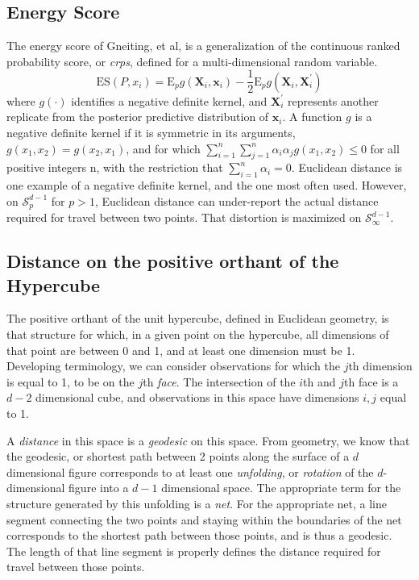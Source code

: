 \subsection{Energy Score}
The energy score of Gneiting, et al\cite{gneiting2007}, is a generalization of the continuous ranked
  probability score, or \emph{crps}, defined for a multi-dimensional random variable.
  \begin{equation}
    \label{eq:es}
    \text{ES}\left(P,x_i\right) =  \text{E}_p g\left(\bm{X}_i, \bm{x}_i\right) - \frac{1}{2}\text{E}_p g\left(\bm{X}_i,\bm{X}_i^{\prime}\right)
  \end{equation}
  where $g(\cdot)$ identifies a negative definite kernel, and $\bm{X}_i^{\prime}$ represents another
  replicate from the posterior predictive distribution of $\bm{x}_i$. A function $g$ is a negative definite kernel if it is symmetric in its arguments, $g(x_1,x_2) = g(x_2,x_1)$, and for which
  $\sum_{i =1}^n\sum_{j=1}^n\alpha_i\alpha_jg(x_1,x_2) \leq 0$ for all positive integers n, with the
  restriction that $\sum_{i=1}^n\alpha_i = 0$.  Euclidean distance is one example of a negative definite kernel,
  and the one most often used.  However,   on $\mathcal{S}_p^{d-1}$ for $p > 1$, Euclidean distance
  can under-report the actual distance required for travel between two points. That distortion is
  maximized on $\mathcal{S}_{\infty}^{d-1}$.

\subsection{Distance on the positive orthant of the Hypercube}
  \label{subsec:distance}
The positive orthant of the unit hypercube, defined in Euclidean geometry, is that structure for
  which, in a given point on the hypercube, all dimensions of that point are between 0 and 1, and
  at least one dimension must be 1.  Developing terminology, we can consider observations for which
  the $j$th dimension is equal to 1, to be on the $j$th \emph{face}.  The intersection of the $i$th
  and $j$th face is a $d-2$ dimensional cube, and observations in this space have dimensions $i,j$
  equal to 1.

A \emph{distance} in this space is a \emph{geodesic} on this space. From geometry, we know that
  the geodesic, or shortest path between 2 points along the surface of a $d$ dimensional figure
  corresponds to at least one \emph{unfolding}, or \emph{rotation} of the $d$-dimensional
  figure into a $d-1$ dimensional space.  The appropriate term for the structure generated by this
  unfolding is a \emph{net}.  For the appropriate net, a line segment connecting the two points and
  staying within the boundaries of the net corresponds to the shortest path between those points\citep{pappas1989}, and is thus a geodesic.  The length of that line segment is properly
  defines the distance required for travel between those points.

